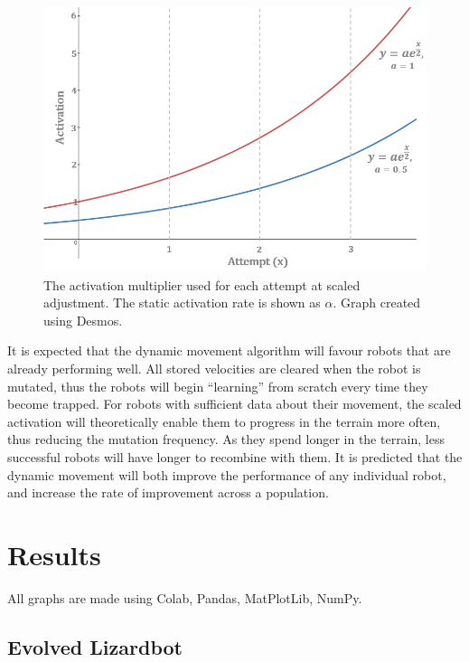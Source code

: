 \documentclass{article}
\begin{document}
\begin{enumerate}
\begin{figure}[H]
\centering
\includegraphics[scale=0.8]{activationFunction}
\caption{The activation multiplier used for each attempt at scaled adjustment. The static activation rate is shown as $\alpha$. Graph created using Desmos. \citep{graphs}}
\end{figure}
\end{enumerate}

It is expected that the dynamic movement algorithm will favour robots that are already performing well. All stored velocities are cleared when the robot is mutated, thus the robots will begin “learning” from scratch every time they become trapped. For robots with sufficient data about their movement, the scaled activation will theoretically enable them to progress in the terrain more often, thus reducing the mutation frequency. As they spend longer in the terrain, less successful robots will have longer to recombine with them. It is predicted that the dynamic movement will both improve the performance of any individual robot, and increase the rate of improvement across a population. \\

\newpage
\section{Results}
All graphs are made using Colab, \citep{colab} Pandas, \citep{pd} MatPlotLib, \citep{plt} NumPy. \citep{np}

\subsection{Evolved Lizardbot}
\end{document}
